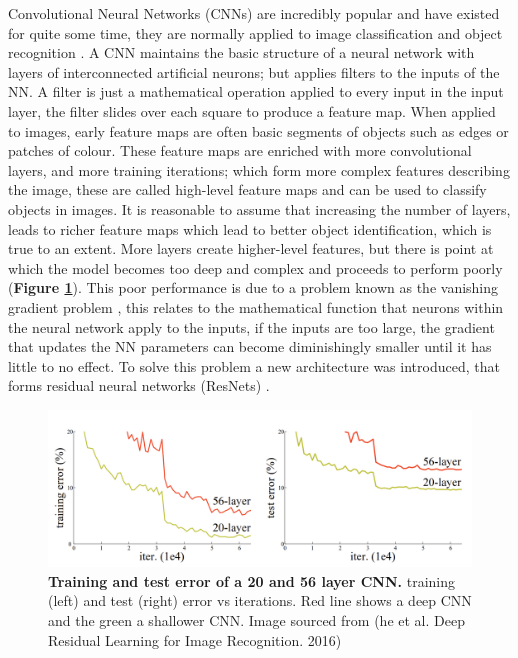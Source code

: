 Convolutional Neural Networks (CNNs) are incredibly popular and have existed for quite some time, they are normally applied to image classification \cite{krizhevskyImageNetClassificationDeep2017} and object recognition \cite{zhangImprovingObjectDetection2015}. A CNN maintains the basic structure of a neural network with layers of interconnected artificial neurons; but applies filters to the inputs of the NN. A filter is just a mathematical operation applied to every input in the input layer, the filter slides over each square to produce a feature map. When applied to images, early feature maps are often basic segments of objects such as edges or patches of colour. These feature maps are enriched with more convolutional layers, and more training iterations; which form more complex features describing the image, these are called high-level feature maps and can be used to classify objects in images. It is reasonable to assume that increasing the number of layers, leads to richer feature maps which lead to better object identification, which is true to an extent. More layers create higher-level features, but there is point at which the model becomes too deep and complex and proceeds to perform poorly (\textbf{Figure \ref{fig:resnet_compare}})\cite{heDeepResidualLearning2016}. This poor performance is due to a problem known as the vanishing gradient problem \cite{bengioLearningLongtermDependencies1994}, this relates to the mathematical function that neurons within the neural network apply to the inputs, if the inputs are too large, the gradient that updates the NN parameters can become diminishingly smaller until it has little to no effect. To solve this problem a new architecture was introduced, that forms residual neural networks (ResNets) \cite{heDeepResidualLearning2016}.

\begin{figure}[h!]
    \centering
    \includegraphics[width=0.95\linewidth]{./images/graph_resent_cnn.png}
    \caption{\textbf{Training and test error of a 20 and 56 layer CNN.} training (left) and test (right) error vs iterations. Red line shows a deep CNN and the green a shallower CNN. Image sourced from (he et al. Deep Residual Learning for Image Recognition. 2016) \cite{heDeepResidualLearning2016} }
    \label{fig:resnet_compare}
\end{figure}

